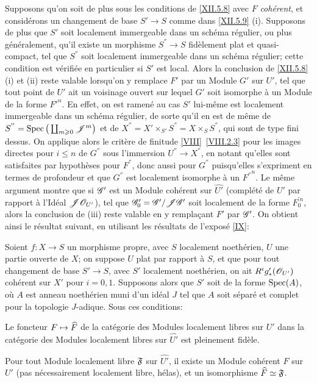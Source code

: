 \begin{remarque} \label{XII.5.9}
Supposons qu'on soit de plus sous les conditions de \ref{XII.5.8} avec $F$ \emph{cohérent}, et consid\'erons un changement de base $S'\to S$ comme dans \ref{XII.5.9} (i). Supposons de plus que $S'$ soit localement immergeable dans un sch\'ema r\'egulier, ou plus g\'en\'eralement, qu'il existe un morphisme $S^{''}\to S$ fid\`element plat et quasi-compact, tel que $S^{''}$ soit localement immergeable dans un sch\'ema r\'egulier; cette condition est v\'erifi\'ee en particulier si $S'$ est local. Alors la conclusion de \ref{XII.5.8} (i) et (ii) reste valable lorsqu'on y remplace $F'$ par un Module $G'$ sur $U'$, tel que tout point de $U'$ ait un voisinage ouvert sur lequel $G'$ soit isomorphe \`a un Module de la forme ${F'}^n$. En effet, on est ramen\'e au cas $S'$ lui-m\^eme est localement immergeable dans un sch\'ema r\'egulier, de sorte qu'il en est de m\^eme de $S^{''}=\operatorname{Spec}\big(\coprod_{m\geqslant 0}{\mathscr J}^m\big)$ et de $X^{''}=X'\times_{S'} S^{''}= X\times_{S} S^{''}$, qui sont de type fini dessus. On applique alors le crit\`ere de finitude \ref{VIII}~\ref{VIII.2.3} pour les images directes pour $i\leq n$ de $G^{''}$ sous l'immersion $U^{''}\to X^{''}$, en notant qu'elles sont satisfaites par hypoth\`eses pour $F^{''}$, donc aussi pour $G^{''}$ puisqu'elles s'expriment en termes de profondeur et que $G^{''}$ est localement isomorphe \`a un ${F^{''}}^n$. Le m\^eme argument montre que si ${\mathscr G}'$ est un Module coh\'erent sur $\widehat{U'}$ (compl\'et\'e de $U'$ par rapport \`a l'Id\'eal ${\mathscr J}{\mathscr O}_{U'}$), tel que ${\mathscr G}'_0={\mathscr G}'/{\mathscr J}{\mathscr G}'$ soit localement de la forme $F_0^{'n}$, alors la conclusion de (iii) reste valable en y rempla\c cant $F'$ par ${\mathscr G}'$. On obtient ainsi le r\'esultat suivant, en utilisant les r\'esultats de l'expos\'e \ref{IX}:
\end{remarque}

\begin{corollaire} \label{XII.5.10}
Soient $f:X\to S$ un morphisme propre, avec $S$ localement noeth\'erien, $U$ une partie ouverte de $X$; on suppose $U$ plat par rapport \`a $S$, et que pour tout changement de base $S'\to S$, avec $S'$ localement noeth\'erien, on ait $R^ig'_\ast({\mathscr O}_{U'})$ coh\'erent sur $X'$ pour $i=0, 1$. Supposons alors que $S'$ soit de la forme $\operatorname{Spec}(A)$, o\`u $A$ est anneau noeth\'erien muni d'un id\'eal $J$ tel que $A$ soit s\'epar\'e et complet pour la topologie $J$-adique. Sous ces conditions:
\begin{enumeratei}
\item
Le foncteur $F\mto\widehat{F}$ de la cat\'egorie des Modules localement libres sur $U'$ dans la cat\'egorie des Modules localement libres sur $\widehat{U'}$ est pleinement fid\`ele.
\item
Pour tout Module localement libre $\mathfrak{F}$ sur $\widehat{U'}$, il existe un Module coh\'erent $F$ sur~$U'$ (pas n\'ecessairement localement libre, h\'elas), et un isomorphisme $\widehat{F}\simeq \mathfrak{F}$.
\end{enumeratei}
\end{corollaire}

